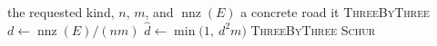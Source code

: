 \documentclass[a4paper,11pt]{book}
\theoremstyle{plain}
\theoremstyle{definition}
\theoremstyle{remark}
\numberwithin{equation}{chapter}
\numberwithin{algorithm}{chapter}
\begin{document}
	\begin{algorithm}[H]
		\caption{\texttt{resolve\_road}}
		\begin{algorithmic}[1]
			\Require the requested kind, $n$, $m$, and $\operatorname{nnz}(E)$
			\Ensure a concrete road
			\State \Return it
			\EndIf
			\State \Return \textsc{ThreeByThree}
			\EndIf
			\State $d\gets\operatorname{nnz}(E)/(nm)$
			\State $\hat d\gets\min\bigl(1,\ d^2m\bigr)$
			\State \Return \textsc{ThreeByThree}
			\EndIf
			\State \Return \textsc{Schur}
		\end{algorithmic}
	\end{algorithm}
\end{document}
